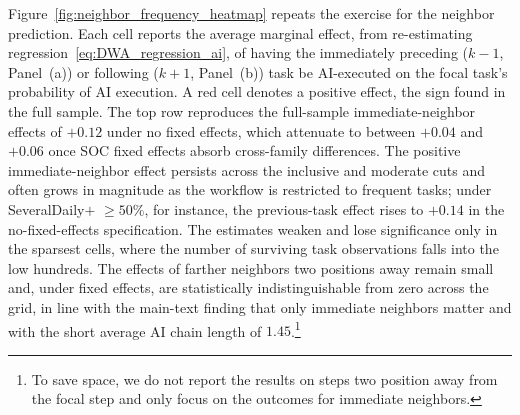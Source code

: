 Figure~\ref{fig:neighbor_frequency_heatmap} repeats the exercise for the neighbor prediction.
Each cell reports the average marginal effect, from re-estimating regression~\eqref{eq:DWA_regression_ai}, of having the immediately preceding ($k{-}1$, Panel~(a)) or following ($k{+}1$, Panel~(b)) task be AI-executed on the focal task's probability of AI execution.
A red cell denotes a positive effect, the sign found in the full sample.
The top row reproduces the full-sample immediate-neighbor effects of $+0.12$ under no fixed effects, which attenuate to between $+0.04$ and $+0.06$ once SOC fixed effects absorb cross-family differences.
The positive immediate-neighbor effect persists across the inclusive and moderate cuts and often grows in magnitude as the workflow is restricted to frequent tasks; under SeveralDaily$+$ $\geq 50\%$, for instance, the previous-task effect rises to $+0.14$ in the no-fixed-effects specification.
The estimates weaken and lose significance only in the sparsest cells, where the number of surviving task observations falls into the low hundreds.
The effects of farther neighbors two positions away remain small and, under fixed effects, are statistically indistinguishable from zero across the grid, in line with the main-text finding that only immediate neighbors matter and with the short average AI chain length of $1.45$.\footnote{ To save space, we do not report the results on steps two position away from the focal step and only focus on the outcomes for immediate neighbors.}

